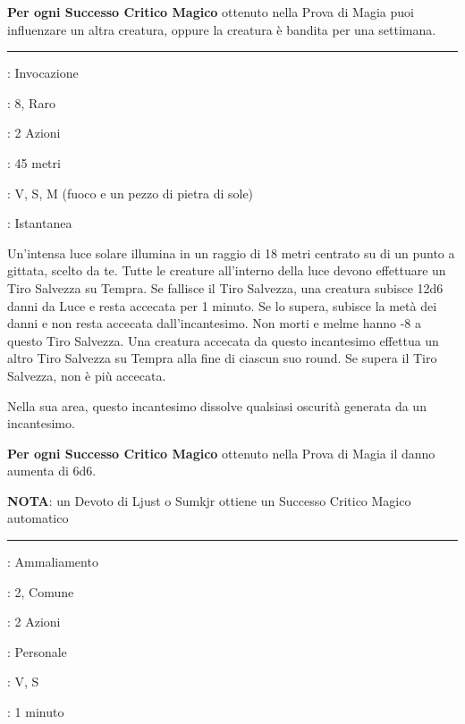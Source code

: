 \begin{multicols}{2}
\textbf{Per ogni Successo Critico Magico} ottenuto nella Prova di Magia puoi influenzare un altra creatura, oppure la creatura è bandita per una settimana.

\smallskip\noindent\rule{\linewidth}{2pt} \hypertarget{Esplosione Solare}{}\medskip{}
\noindent
\begin{description}[noitemsep, topsep=0pt, parsep=0pt, partopsep=0pt, leftmargin=0cm, labelwidth=2.8cm]
	\item[\textbf{Lista di Magia}]: Invocazione
	\item[\textbf{Livello}]: 8, Raro
	\item[\textbf{T. di Lancio}]: 2 Azioni
	\item[\textbf{Gittata}]: 45 metri
	\item[\textbf{Componenti}]: V, S, M (fuoco e un pezzo di pietra di sole)
	\item[\textbf{Durata}]: Istantanea
\end{description}

Un'intensa luce solare illumina in un raggio di 18 metri centrato su di un punto a gittata, scelto da te. Tutte le creature all'interno della luce devono effettuare un Tiro Salvezza su Tempra. Se fallisce il Tiro Salvezza, una creatura subisce 12d6 danni da Luce e resta accecata per 1 minuto. Se lo supera, subisce la metà dei danni e non resta accecata dall'incantesimo. Non morti e melme hanno -8 a questo Tiro Salvezza. Una creatura accecata da questo incantesimo effettua un altro Tiro Salvezza su Tempra alla fine di ciascun suo round. Se supera il Tiro Salvezza, non è più accecata.

Nella sua area, questo incantesimo dissolve qualsiasi oscurità generata da un incantesimo.

\textbf{Per ogni Successo Critico Magico} ottenuto nella Prova di Magia il danno aumenta di 6d6.

\textbf{NOTA}: un Devoto di Ljust o Sumkjr ottiene un Successo Critico Magico automatico

\smallskip\noindent\rule{\linewidth}{2pt} \hypertarget{Estasiare}{}\medskip{}
\noindent
\begin{description}[noitemsep, topsep=0pt, parsep=0pt, partopsep=0pt, leftmargin=0cm, labelwidth=2.8cm]
	\item[\textbf{Lista di Magia}]: Ammaliamento
	\item[\textbf{Livello}]: 2, Comune
	\item[\textbf{T. di Lancio}]: 2 Azioni
	\item[\textbf{Gittata}]: Personale
	\item[\textbf{Componenti}]: V, S
	\item[\textbf{Durata}]: 1 minuto
\end{description}


\end{multicols}
